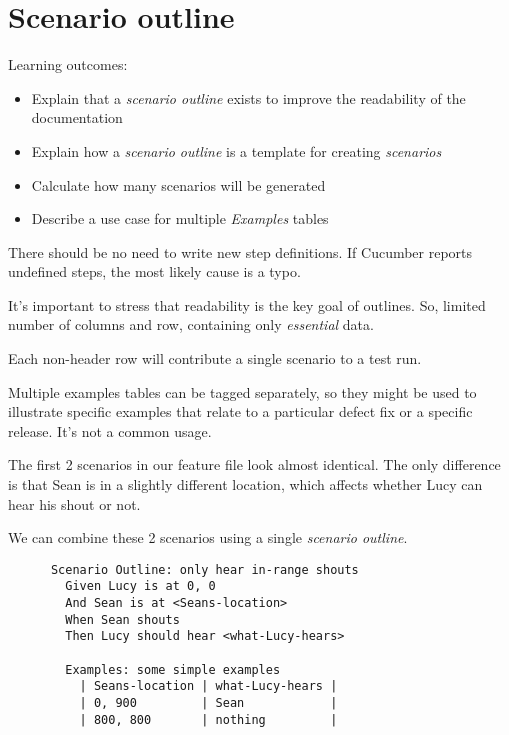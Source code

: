 \chapter*{Scenario outline}

\ifnotes

    Learning outcomes:
    
    \begin{itemize}
        \item Explain that a \emph{scenario outline} exists to improve the readability of the documentation
        \item Explain how a \emph{scenario outline} is a template for creating \emph{scenarios}
        \item Calculate how many scenarios will be generated
        \item Describe a use case for multiple \emph{Examples} tables
    \end{itemize}

    There should be no need to write new step definitions. If Cucumber reports undefined steps, the most likely cause is a typo.
    
    It's important to stress that readability is the key goal of outlines. So, limited number of columns and row, containing only \emph{essential} data.
    
    Each non-header row will contribute a single scenario to a test run.
    
    Multiple examples tables can be tagged separately, so they might be used to illustrate specific examples that relate to a particular defect fix or a specific release. It's not a common usage.
\fi 

\ifcontent 
    The first 2 scenarios in our feature file look almost identical. The only difference is that Sean is in a slightly different location, which affects whether Lucy can hear his shout or not.
    
    We can combine these 2 scenarios using a single \emph{scenario outline}. 
    
    \begin{verbatim}
      Scenario Outline: only hear in-range shouts
        Given Lucy is at 0, 0
        And Sean is at <Seans-location>
        When Sean shouts
        Then Lucy should hear <what-Lucy-hears>
        
        Examples: some simple examples
          | Seans-location | what-Lucy-hears |
          | 0, 900         | Sean            |
          | 800, 800       | nothing         |
    \end{verbatim}
    
